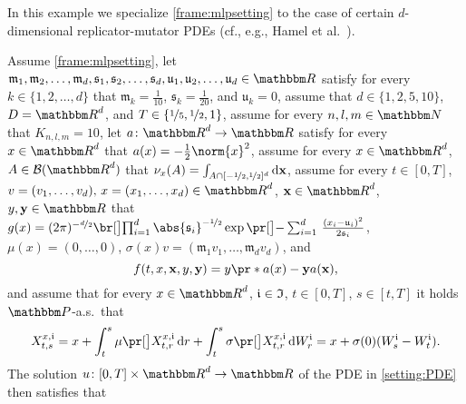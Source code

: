 \begin{example}
	\label{exampleMLP:hamel}
	In this example we specialize \cref{frame:mlpsetting} to the case of certain $d$-dimensional replicator-mutator PDEs (cf., e.g., Hamel et al.~\citep{Hamel2020}). 

	Assume 
		\cref{frame:mlpsetting}, 
	let
		$\mathfrak{m}_1, \mathfrak{m}_2, \dots,\mathfrak{m}_d, \mathfrak{s}_1, \mathfrak{s}_2, \dots, \mathfrak{s}_d,\mathfrak{u}_1, \mathfrak{u}_2,\dots,\mathfrak{u}_d \in \R$
	satisfy 
		for every
			$k \in \{1,2,\dots,d\}$
		that
			$\mathfrak{m}_k = \tfrac{1}{10}$,
			$\mathfrak{s}_k = \tfrac{1}{20}$,	and
			$\mathfrak{u}_k = 0$,
	assume that
		$d\in\{1,2,5,10\}$,
		$\D = \R^{d}$, and
		$T\in\{\nicefrac{1}{5},\nicefrac{1}{2},1\}$,
	assume for every 
		$n,l,m\in \N$
	that 
		$K_{n,l,m} = 10$,
	let
		$a \colon \R^d \to \R$
	satisfy 
		for every
			$x \in \R^d$
		that
			$a(x) = -\frac{1}{2}\norm{x}^2$,
	assume for every
		$x \in \R^d$,
		$A \in \mathcal{B}(\R^d)$
	that
		$\nu_x(A) = \int_{A\cap[-\nicefrac12,\nicefrac12]^d} \mathrm{d} {\mathbf x}$,
	assume for every
		$t \in [0,T]$,
		$v= (v_1,\dots,v_d),\,x = (x_1,\dots,x_d)\in \R^d$,
		$\mathbf{x} \in \R^d$,
		$y,\mathbf{y} \in \R$
	that
		$g(x)= (2\pi)^{-\nicefrac{d}{2}} \bbr{\prod_{ i = 1 }^d \abs{\mathfrak{s}_i}^{-\nicefrac{1}{2}}} \exp \bpr{-\sum_{i = 1}^d \, \frac{(x_i - \mathfrak{u}_i )^2}{2\mathfrak{s}_i}}$,
		$\mu(x)=(0,\dots,0)$,
		$\sigma(x)v=(\mathfrak{m}_1 v_1, \dots, \mathfrak{m}_d v_d)$, and
	\begin{equation}
		f(t,x,\mathbf{x},y,\mathbf{y}) 
		=
		y \pr*{a(x) -  \mathbf{y}  a({\mathbf x}) }
		,
	\end{equation}
	and assume that 
		for every 
			$x\in \R^{d}$, 
			$\mathfrak{i} \in \mathfrak{I}$, 
			$t\in [0,T]$, 
			$s\in [t,T]$ 
		it holds $\P$-a.s.\ that
		\begin{equation}
			X^{x,\dindex}_{t,s} 
			= 
			x + \int_{t}^{s} \mu\bpr{X^{x,\dindex}_{t,r}} \, \diff r + \int^{s}_{t} \sigma \bpr{X^{x,\dindex}_{t,r}} \, \diff W^{\dindex}_{r} 
			=
			x+\sigma(0)(W^\dindex_s-W^\dindex_t)
			.
		\end{equation}
	The solution 
		$u\colon[0,T]\times \R^d \to \R$ 
		of the PDE in \eqref{setting:PDE} then satisfies that 

\end{example}

